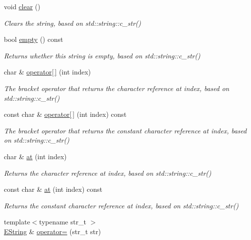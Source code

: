 \begin{DoxyCompactItemize}
void \hyperlink{class_triton_1_1_util_1_1_e_string_ab6171a0c2788dc8ad9f92ffcf0b1257e}{clear} ()
\begin{DoxyCompactList}\small\item\em Clears the string, based on std\+::string\+::c\+\_\+str() \end{DoxyCompactList}\item 
bool \hyperlink{class_triton_1_1_util_1_1_e_string_a5f296db0f9fb423e66902f82d8802618}{empty} () const 
\begin{DoxyCompactList}\small\item\em Returns whether this string is empty, based on std\+::string\+::c\+\_\+str() \end{DoxyCompactList}\item 
char \& \hyperlink{class_triton_1_1_util_1_1_e_string_ad6fd6a404af70312156fada80b84e26f}{operator\mbox{[}$\,$\mbox{]}} (int index)
\begin{DoxyCompactList}\small\item\em The bracket operator that returns the character reference at index, based on std\+::string\+::c\+\_\+str() \end{DoxyCompactList}\item 
const char \& \hyperlink{class_triton_1_1_util_1_1_e_string_aa4e06961379c54b7133e555f233a149e}{operator\mbox{[}$\,$\mbox{]}} (int index) const 
\begin{DoxyCompactList}\small\item\em The bracket operator that returns the constant character reference at index, based on std\+::string\+::c\+\_\+str() \end{DoxyCompactList}\item 
char \& \hyperlink{class_triton_1_1_util_1_1_e_string_a695aef978a0aabdbcca4a3645281f697}{at} (int index)
\begin{DoxyCompactList}\small\item\em Returns the character reference at index, based on std\+::string\+::c\+\_\+str() \end{DoxyCompactList}\item 
const char \& \hyperlink{class_triton_1_1_util_1_1_e_string_a4c4e2cd63147c80c0c38f059c1ebe690}{at} (int index) const 
\begin{DoxyCompactList}\small\item\em Returns the constant character reference at index, based on std\+::string\+::c\+\_\+str() \end{DoxyCompactList}\item 
{\footnotesize template$<$typename str\+\_\+t $>$ }\\\hyperlink{class_triton_1_1_util_1_1_e_string}{E\+String} \& \hyperlink{class_triton_1_1_util_1_1_e_string_a20cdaa49fe69cca540055bc6936c2fe2}{operator=} (str\+\_\+t str)

\end{DoxyCompactItemize}
